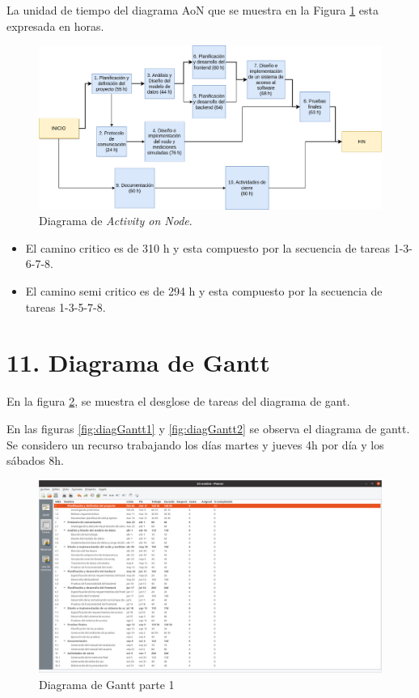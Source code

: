 \documentclass[
11pt, %
]{charter}
\begin{document}
La unidad de tiempo del diagrama AoN que se muestra en la Figura \ref{fig:AoN} esta expresada en horas.

\begin{figure}[htpb]
\centering 
\includegraphics[width=1\textwidth]{./Figuras/DiagramaActivityONNode.png}
\caption{Diagrama de \textit{Activity on Node}.}
\label{fig:AoN}
\end{figure}

\begin{itemize}
	\item El camino critico es de 310 h y esta compuesto por la secuencia de tareas 1-3-6-7-8.
	\item El camino semi critico es de 294 h y esta compuesto por la secuencia de tareas 1-3-5-7-8.
\end{itemize}

\section{11. Diagrama de Gantt}
\label{sec:gantt}



En la figura \ref{fig:TareasGant}, se muestra el desglose de tareas del diagrama de gant.

En las figuras \ref{fig:diagGantt1} y \ref{fig:diagGantt2} se observa el diagrama de gantt. Se considero un recurso trabajando los días martes y jueves 4h por día y los sábados 8h. 

\begin{landscape}
\begin{figure}[htpb]
\centering 
\includegraphics[height=.85\textheight]{./Figuras/TareasGant.png}
\caption{Diagrama de Gantt parte 1}
\label{fig:TareasGant}
\end{figure}
\end{landscape}
\end{document}
